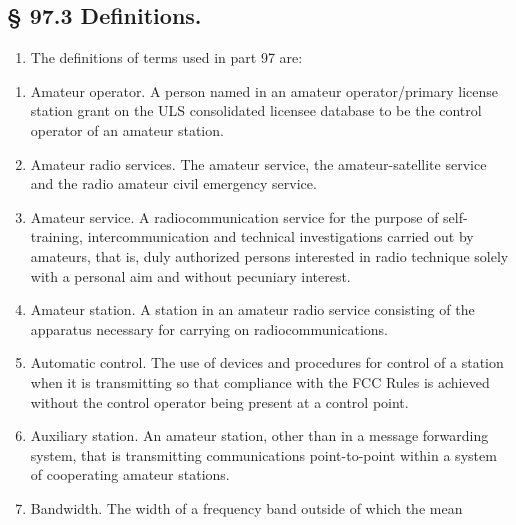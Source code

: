 \documentclass[
  letterpaper,
  DIV=11,
  numbers=noendperiod]{scrreport}
\providecommand{\tightlist}{%
  \setlength{\itemsep}{0pt}\setlength{\parskip}{0pt}}\usepackage{longtable,booktabs,array}
\begin{document}
\hypertarget{97.3}{%
\subsection*{§ 97.3 Definitions.}\label{97.3}}

\begin{enumerate}
\def\labelenumi{(\alph{enumi})}
\tightlist
\item
  The definitions of terms used in part 97 are:
\end{enumerate}

\begin{enumerate}
\def\labelenumi{(\arabic{enumi})}
\item
  \leavevmode{}%
  Amateur operator. A person named in an amateur operator/primary
  license station grant on the ULS consolidated licensee database to be
  the control operator of an amateur station.
\item
  \leavevmode{}%
  Amateur radio services. The amateur service, the amateur-satellite
  service and the radio amateur civil emergency service.
\item
  \leavevmode{}%
  Amateur service. A radiocommunication service for the purpose of
  self-training, intercommunication and technical investigations carried
  out by amateurs, that is, duly authorized persons interested in radio
  technique solely with a personal aim and without pecuniary interest.
\item
  \leavevmode{}%
  Amateur station. A station in an amateur radio service consisting of
  the apparatus necessary for carrying on radiocommunications.
\item
  \leavevmode{}%
  Automatic control. The use of devices and procedures for control of a
  station when it is transmitting so that compliance with the FCC Rules
  is achieved without the control operator being present at a control
  point.
\item
  \leavevmode{}%
  Auxiliary station. An amateur station, other than in a message
  forwarding system, that is transmitting communications point-to-point
  within a system of cooperating amateur stations.
\item
  \leavevmode{}%
  Bandwidth. The width of a frequency band outside of which the mean

\end{enumerate}
\end{document}
